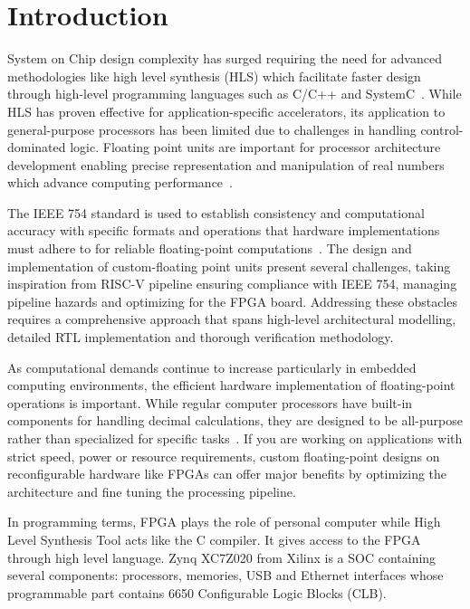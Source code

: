 \chapter{Introduction}
\label{chap:introduction}

System on Chip design complexity has surged requiring the need for advanced methodologies like high level synthesis (HLS) which facilitate faster design through high-level programming languages such as C/C++ and SystemC~\cite{ref1}. While HLS has proven effective for application-specific accelerators, its application to general-purpose processors has been limited due to challenges in handling control-dominated logic. Floating point units are important for processor architecture development enabling precise representation and manipulation of real numbers which advance computing performance~\cite{ref2}.

The IEEE 754 standard is used to establish consistency and computational accuracy with specific formats and operations that hardware implementations must adhere to for reliable floating-point computations~\cite{ref3}. The design and implementation of custom-floating point units present several challenges, taking inspiration from RISC-V pipeline ensuring compliance with IEEE 754, managing pipeline hazards and optimizing for the FPGA board. Addressing these obstacles requires a comprehensive approach that spans high-level architectural modelling, detailed RTL implementation and thorough verification methodology.

As computational demands continue to increase particularly in embedded computing environments, the efficient hardware implementation of floating-point operations is important. While regular computer processors have built-in components for handling decimal calculations, they are designed to be all-purpose rather than specialized for specific tasks~\cite{ref4}. If you are working on applications with strict speed, power or resource requirements, custom floating-point designs on reconfigurable hardware like FPGAs can offer major benefits by optimizing the architecture and fine tuning the processing pipeline.

In programming terms, FPGA plays the role of personal computer while High Level Synthesis Tool acts like the C compiler. It gives access to the FPGA through high level language. Zynq XC7Z020 from Xilinx is a SOC containing several components: processors, memories, USB and Ethernet interfaces whose programmable part contains 6650 Configurable Logic Blocks (CLB).~\cite{ref3}

